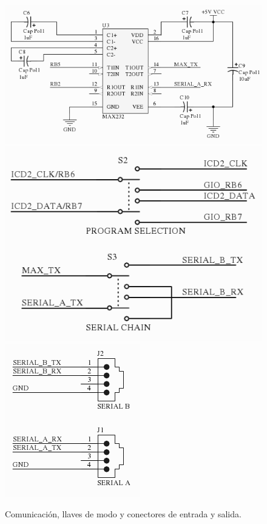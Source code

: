 \begin{figure}
	\centering
	\includegraphics[scale=.28]{figuras/servo_schemaComm1.png}
	\includegraphics[scale=.2]{figuras/servo_schemaComm2.png}
	\includegraphics[scale=.28]{figuras/servo_schemaComm3.png}
	\caption{Comunicaci\'on, llaves de modo y conectores de entrada y salida.}
	\label{hF_placa_servo_schema2}
\end{figure}

